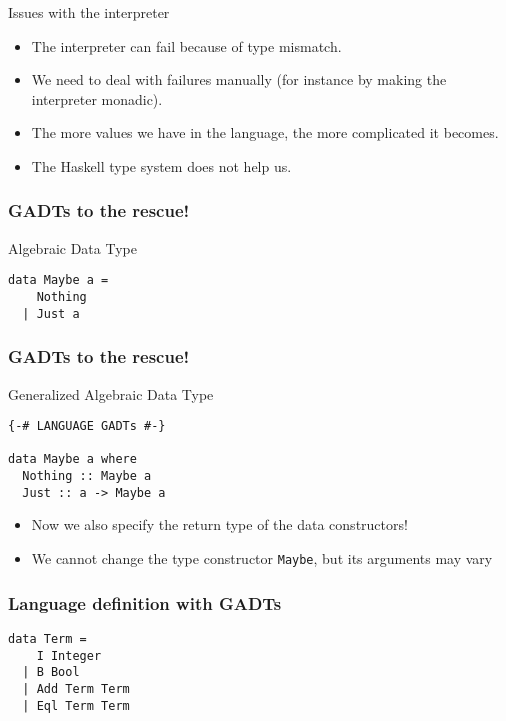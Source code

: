 \documentclass[pdftex,aspectratio=169]{beamer}
\begin{document}
\begin{frame}{Issues with the interpreter}
  \begin{itemize}[<+->]
\item The interpreter can fail because of type mismatch.
\item We need to deal with failures manually (for instance by making
  the interpreter monadic).
\item The more values we have in the language, the more complicated it becomes.
\item The Haskell type system does not help us.
\end{itemize}
\end{frame}

\begin{frame}[fragile]
  \frametitle{GADTs to the rescue!}

  \begin{block}{Algebraic Data Type}
    \begin{lstlisting}
data Maybe a =
    Nothing
  | Just a
\end{lstlisting}

  \end{block}
\end{frame}

\begin{frame}[fragile]
  \frametitle{GADTs to the rescue!}

  \begin{block}{Generalized Algebraic Data Type}
    \begin{lstlisting}
{-# LANGUAGE GADTs #-}

data Maybe a where
  Nothing :: Maybe a
  Just :: a -> Maybe a
\end{lstlisting}

  \end{block}\pause
  \begin{itemize}
  \item Now we also specify the return type of the data constructors!
  \item We cannot change the type constructor \lstinline{Maybe}, but
    its arguments may vary
  \end{itemize}
\end{frame}

\begin{frame}[fragile]
  \frametitle{Language definition with GADTs}
  \begin{block}{}
    \begin{lstlisting}
data Term =
    I Integer
  | B Bool
  | Add Term Term
  | Eql Term Term      
    \end{lstlisting}
  \end{block}
\end{frame}
\end{document}
